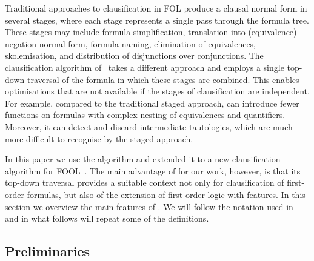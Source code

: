 
%
%

Traditional approaches to
clausification in FOL \cite{nonnengart2001computing,Vampire13} produce a clausal normal
form in several stages, where each stage
represents a single pass through the formula tree. These stages may include formula simplification, translation into (equivalence) negation normal form,
formula naming, elimination of equivalences, skolemisation, and distribution of
disjunctions over conjunctions. The \newcnf{} clausification algorithm
of~\cite{newcnf_fol} takes a different approach and employs a single top-down
traversal of the formula in which these stages are combined.  
This enables optimisations that are not available if the stages of clausification are independent. For example, compared to the traditional staged approach, \newcnf{} can introduce fewer \skolem{} functions on formulas with complex nesting of equivalences and quantifiers. Moreover, it can detect and discard intermediate tautologies, 
which are much more difficult to recognise by the staged approach.
%
%

In this paper we use the \newcnf{} algorithm and extended it to a new clausification algorithm for FOOL~\cite{FOOL}. 
The main advantage of \newcnf{} for our work, however, is that its top-down
traversal provides a suitable context not only for clausification of first-order
formulas, but also of the extension of first-order logic with \folb{}
features. In this section we overview the main features of \newcnf{}. We will follow the notation used in~\cite{newcnf_fol} and in what follows will repeat some of the definitions. 

\subsection{Preliminaries}

